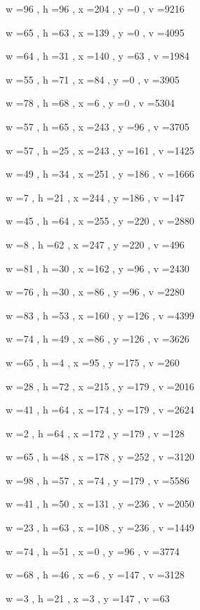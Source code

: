 \documentclass[11pt]{article}
\begin{document}
w =96 , h =96 , x =204 , y =0 , v =9216
\par
w =65 , h =63 , x =139 , y =0 , v =4095
\par
w =64 , h =31 , x =140 , y =63 , v =1984
\par
w =55 , h =71 , x =84 , y =0 , v =3905
\par
w =78 , h =68 , x =6 , y =0 , v =5304
\par
w =57 , h =65 , x =243 , y =96 , v =3705
\par
w =57 , h =25 , x =243 , y =161 , v =1425
\par
w =49 , h =34 , x =251 , y =186 , v =1666
\par
w =7 , h =21 , x =244 , y =186 , v =147
\par
w =45 , h =64 , x =255 , y =220 , v =2880
\par
w =8 , h =62 , x =247 , y =220 , v =496
\par
w =81 , h =30 , x =162 , y =96 , v =2430
\par
w =76 , h =30 , x =86 , y =96 , v =2280
\par
w =83 , h =53 , x =160 , y =126 , v =4399
\par
w =74 , h =49 , x =86 , y =126 , v =3626
\par
w =65 , h =4 , x =95 , y =175 , v =260
\par
w =28 , h =72 , x =215 , y =179 , v =2016
\par
w =41 , h =64 , x =174 , y =179 , v =2624
\par
w =2 , h =64 , x =172 , y =179 , v =128
\par
w =65 , h =48 , x =178 , y =252 , v =3120
\par
w =98 , h =57 , x =74 , y =179 , v =5586
\par
w =41 , h =50 , x =131 , y =236 , v =2050
\par
w =23 , h =63 , x =108 , y =236 , v =1449
\par
w =74 , h =51 , x =0 , y =96 , v =3774
\par
w =68 , h =46 , x =6 , y =147 , v =3128
\par
w =3 , h =21 , x =3 , y =147 , v =63
\par
\newpage
\end{document}
